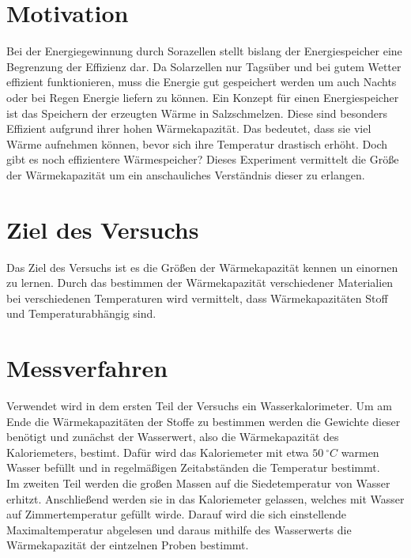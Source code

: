 \section{Motivation}

Bei der Energiegewinnung durch Sorazellen stellt bislang der Energiespeicher eine Begrenzung der Effizienz dar.
Da Solarzellen nur Tagsüber und bei gutem Wetter effizient funktionieren, muss die Energie gut gespeichert werden um auch Nachts oder bei Regen Energie liefern zu können.
Ein Konzept für einen Energiespeicher ist das Speichern der erzeugten Wärme in Salzschmelzen.
Diese sind besonders Effizient aufgrund ihrer hohen Wärmekapazität. Das bedeutet, dass sie viel Wärme aufnehmen können, bevor sich ihre Temperatur drastisch erhöht.
Doch gibt es noch effizientere Wärmespeicher? Dieses Experiment vermittelt die Größe der Wärmekapazität um ein anschauliches Verständnis dieser zu erlangen.

\section{Ziel des Versuchs}

Das Ziel des Versuchs ist es die Größen der Wärmekapazität kennen un einornen zu lernen.
Durch das bestimmen der Wärmekapazität verschiedener Materialien bei verschiedenen Temperaturen
wird vermittelt, dass Wärmekapazitäten Stoff und Temperaturabhängig sind.

\section{Messverfahren}

Verwendet wird in dem ersten Teil der Versuchs ein Wasserkalorimeter.
Um am Ende die Wärmekapazitäten der Stoffe zu bestimmen werden die Gewichte dieser benötigt und zunächst der Wasserwert, also die Wärmekapazität des Kaloriemeters, bestimt.
Dafür wird das Kaloriemeter mit etwa $50\ ^\circ C$ warmen Wasser befüllt und in regelmäßigen Zeitabständen die Temperatur bestimmt.\\

Im zweiten Teil werden die großen Massen auf die Siedetemperatur von Wasser erhitzt. Anschließend werden sie in das Kaloriemeter gelassen, welches mit Wasser auf Zimmertemperatur gefüllt wirde.
Darauf wird die sich einstellende Maximaltemperatur abgelesen und daraus mithilfe des Wasserwerts die Wärmekapazität der eintzelnen Proben bestimmt. \\

